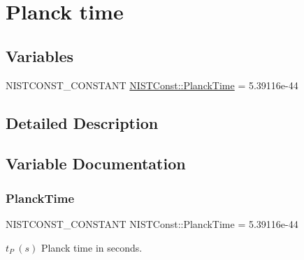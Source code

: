 \hypertarget{group___n_i_s_t_const-_planck_time}{}\section{Planck time}
\label{group___n_i_s_t_const-_planck_time}
\subsection*{Variables}
\begin{DoxyCompactItemize}
\item 
N\+I\+S\+T\+C\+O\+N\+S\+T\+\_\+\+C\+O\+N\+S\+T\+A\+NT \mbox{\hyperlink{group___n_i_s_t_const-_planck_time_ga2815a73ce280c6bc20668d30e2c199fa}{N\+I\+S\+T\+Const\+::\+Planck\+Time}} = 5.\+39116e-\/44
\end{DoxyCompactItemize}


\subsection{Detailed Description}


\subsection{Variable Documentation}
\mbox{\label{group___n_i_s_t_const-_planck_time_ga2815a73ce280c6bc20668d30e2c199fa}} 
\subsubsection{\texorpdfstring{Planck\+Time}{PlanckTime}}
{\footnotesize\ttfamily N\+I\+S\+T\+C\+O\+N\+S\+T\+\_\+\+C\+O\+N\+S\+T\+A\+NT N\+I\+S\+T\+Const\+::\+Planck\+Time = 5.\+39116e-\/44}

$t_P \ (s)$ Planck time in seconds. 